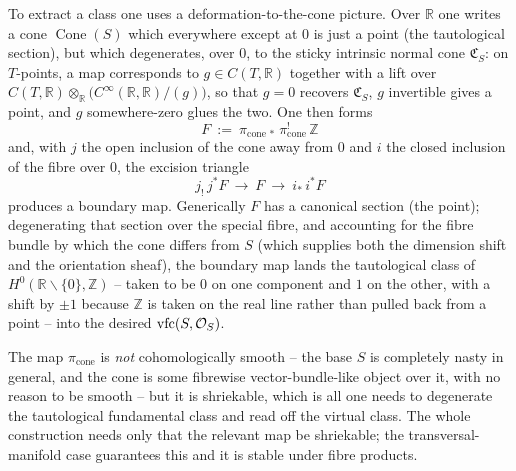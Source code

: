 To extract a class one uses a deformation-to-the-cone picture. Over $\mathbb R$ one
writes a cone $\operatorname{Cone}(S)$ which everywhere except at $0$ is just a
point (the tautological section), but which degenerates, over $0$, to the sticky
intrinsic normal cone $\mathfrak C_S$: on $T$-points, a map corresponds to
$g\in C(T,\mathbb R)$ together with a lift over
$C(T,\mathbb R)\otimes_{\mathbb R}\bigl(C^\infty(\mathbb R,\mathbb R)/(g)\bigr)$,
so that $g=0$ recovers $\mathfrak C_S$, $g$ invertible gives a point, and $g$
somewhere-zero glues the two. One then forms
\begin{equation*}
F\ :=\ \pi_{\mathrm{cone}\,*}\,\pi_{\mathrm{cone}}^{!}\,\mathbb Z
\end{equation*}
and, with $j$ the open inclusion of the cone away from $0$ and $i$ the closed
inclusion of the fibre over $0$, the excision triangle
\begin{equation*}
j_!\,j^*F\ \longrightarrow\ F\ \longrightarrow\ i_*\,i^*F
\end{equation*}
produces a boundary map. Generically $F$ has a canonical section (the point);
degenerating that section over the special fibre, and accounting for the fibre
bundle by which the cone differs from $S$ (which supplies both the dimension shift
and the orientation sheaf), the boundary map lands the tautological class of
$H^0(\mathbb R\smallsetminus\{0\},\mathbb Z)$ -- taken to be $0$ on one component
and $1$ on the other, with a shift by $\pm1$ because $\mathbb Z$ is taken on the
real line rather than pulled back from a point -- into the desired
$\operatorname{vfc}(S,\mathcal O_S)$.

\begin{remark}
\label{rmk:24:cone-shriekable}
The map $\pi_{\mathrm{cone}}$ is \emph{not} cohomologically smooth -- the base
$S$ is completely nasty in general, and the cone is some fibrewise
vector-bundle-like object over it, with no reason to be smooth -- but it is
shriekable, which is all one needs to degenerate the tautological fundamental
class and read off the virtual class. The whole construction needs only that the
relevant map be shriekable; the transversal-manifold case guarantees this and it
is stable under fibre products.
\end{remark}
